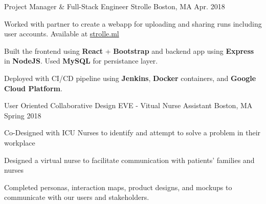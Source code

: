 

\begin{cventries}

  \cventry
    {Project Manager \& Full-Stack Engineer} %
    {Strolle} %
    {Boston, MA} %
    {Apr. 2018} %
    {
      \begin{cvitems} %
        \item Worked with partner to create a webapp for uploading and sharing runs including user accounts. Available at \href{https://strolle.ml/}{strolle.ml} 
        \item Built the frontend using \textbf{React} + \textbf{Bootstrap} and backend app using \textbf{Express} in \textbf{NodeJS}. Used \textbf{MySQL} for persistance layer.
        \item Deployed with CI/CD pipeline using \textbf{Jenkins}, \textbf{Docker} containers, and \textbf{Google Cloud Platform}.
      \end{cvitems}
    }


  \cventry
  {User Oriented Collaborative Design} %
  {EVE - Vitual Nurse Assistant} %
  {Boston, MA} %
  {Spring 2018} %
  {
    \begin{cvitems} %
      \item Co-Designed with ICU Nurses to identify and attempt to solve a problem in their workplace
      \item Designed a virtual nurse to facilitate communication with patients' families and nurses
      \item Completed personas, interaction maps, product designs, and mockups to communicate with our users and stakeholders.
    \end{cvitems}
  }


\end{cventries}
